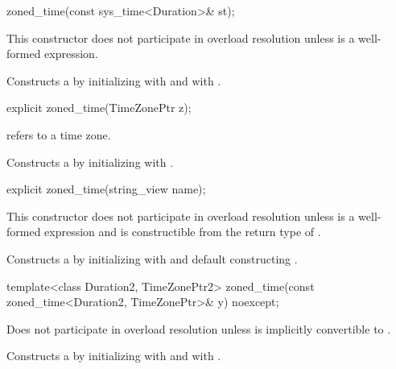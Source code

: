 \begin{itemdecl}
zoned_time(const sys_time<Duration>& st);
\end{itemdecl}

\begin{itemdescr}
\pnum
\remarks
This constructor does not participate in overload resolution unless
 is a well-formed expression.

\pnum
\effects
Constructs a  by
initializing  with  and  with .
\end{itemdescr}

\begin{itemdecl}
explicit zoned_time(TimeZonePtr z);
\end{itemdecl}

\begin{itemdescr}
\pnum
\requires {} refers to a time zone.

\pnum
\effects Constructs a  by
initializing  with .
\end{itemdescr}

\begin{itemdecl}
explicit zoned_time(string_view name);
\end{itemdecl}

\begin{itemdescr}
\pnum
\remarks
This constructor does not participate in overload resolution unless
 is a well-formed expression and
 is constructible from the return type of .

\pnum
\effects
Constructs a  by
initializing  with  and
default constructing .
\end{itemdescr}

\begin{itemdecl}
template<class Duration2, TimeZonePtr2>
  zoned_time(const zoned_time<Duration2, TimeZonePtr>& y) noexcept;
\end{itemdecl}

\begin{itemdescr}
\pnum
\remarks
Does not participate in overload resolution unless
 is implicitly convertible to .

\pnum
\effects
Constructs a  by
initializing  with  and  with .
\end{itemdescr}

